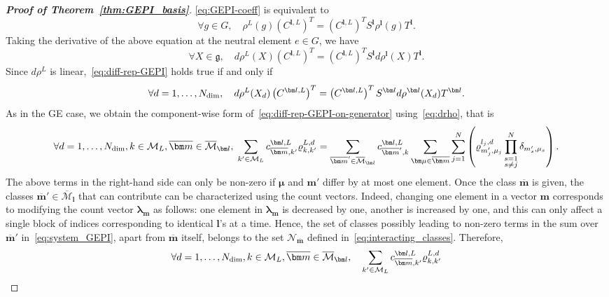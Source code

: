 \documentclass{article}
\newcommand{\vrho}[2]{\varrho^{#1}_{#2}}
\newcommand{\rep}[2]{\rho^{#1}_{#2}}
\newcommand{\blamb}[2]{\bm\lambda^{#1}_{#2}}
\newcommand{\dd}{{d}}
\numberwithin{equation}{section}
\def\bl{{\bm l}}
\def\bbm{{\bm m}}
\def\bmu{{\bm \mu}}
\def\obm{{\overline\bbm}}
\def\calN{\mathcal{N}}
\def\calM{\mathcal{M}}
\def\oMl{\overline{\calM}_\bl}
\def\Nat{{N}}
\begin{document}
\begin{proof}[\bf{Proof of Theorem~\ref{thm:GEPI_basis}}]
\eqref{eq:GEPI-coeff} is equivalent to
\begin{equation}\label{eq:matrix_GE-PI_sylvester}
    \forall g\in G, \quad \rep{L}{}(g)\left(C^{\bl,L}\right)^T = \left(C^{\bl,L}\right)^TS^\bl\rep{\bl}{}(g)T^\bl.
\end{equation}  
Taking the derivative of the above equation at the neutral element $e\in G$, we have
\begin{equation}\label{eq:diff-rep-GEPI}
    \forall X\in\mathfrak g, \quad d\rep{L}{}(X)\left(C^{\bl,L}\right)^T = \left(C^{\bl,L}\right)^TS^\bl d\rep{\bl}{}(X)T^\bl.
\end{equation}
Since $d\rep{L}{}$ is linear,~\eqref{eq:diff-rep-GEPI} holds true if and only if
\begin{equation}\label{eq:diff-rep-GEPI-on-generator}
    \forall\dd=1,\ldots,N_{\rm dim},\quad d\rep{L}{}(X_\dd)\left(C^{\bl,L}\right)^T = \left(C^{\bl,L}\right)^TS^\bl d\rep{\bl}{}(X_\dd)T^\bl.
\end{equation}
As in the GE case, we obtain the component-wise form of~\eqref{eq:diff-rep-GEPI-on-generator} using~\eqref{eq:drho}, that is
\begin{equation}
\label{eq:system_GEPI}
    \forall \dd =1,\ldots,N_{\rm{dim}}, k\in\calM_L, \obm \in \oMl, \;
    \sum_{k'\in\calM_L}c_{\obm,k'}^{\bl,L} \vrho{L,\dd}{k,k'}  
    = \sum_{\obm' \in \oMl} c_{\obm',k}^{\bl,L}
    \sum_{\bmu\in\obm}
    \sum_{j=1}^\Nat \left( \vrho{l_j,\dd}{m'_j,\mu_j}\prod_{\substack{s=1 \\s\ne j}}^\Nat \delta_{m'_s,\mu_s} \right).
\end{equation}
The above terms in the right-hand side can only be non-zero if $\bmu$ and $\bbm'$ differ by at most one element.
Once the class $\obm$ is given, the classes $\obm'\in \oMl$ that can contribute can be characterized using the count vectors. Indeed, changing one element in a vector $\bbm$ corresponds to modifying the count vector $\blamb{}{\bbm}$ as follows: one element in $\blamb{}{\bbm}$ is decreased by one, another is increased by one, and this can only affect a single block of indices corresponding to identical $\bl$'s at a time. 
Hence, the set of classes possibly leading to non-zero terms in the sum over $\obm'$ in~\eqref{eq:system_GEPI}, apart from $\obm$ itself, belongs to the set
$\calN_\obm$ defined in~\eqref{eq:interacting_classes}.
Therefore,
 \begin{align*}
     \forall \dd =1,\ldots,N_{\rm{dim}}, k\in\calM_L, \obm \in \oMl,
     \quad   \sum_{k'\in\calM_L}c_{\obm,k'}^{\bl,L} \vrho{L,\dd}{k,k'}  

\end{align*}
\end{proof}
\end{document}
